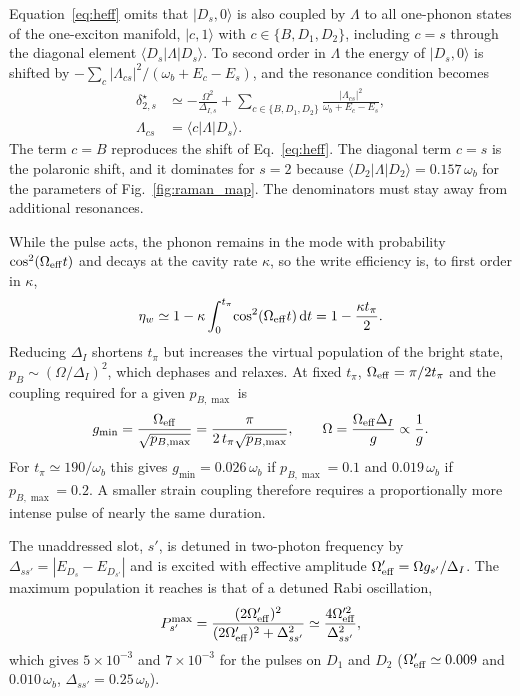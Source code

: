 \documentclass[aps,pra,preprint,groupedaddress,amsmath,amssymb,floatfix]{revtex4-2}
\newcommand{\ket}[1]{\lvert #1\rangle}
\newcommand{\bra}[1]{\langle #1\rvert}
\newcommand{\wb}{\omega_b}
\begin{document}
Equation~\eqref{eq:heff} omits that $\ket{D_s,0}$ is also coupled by $\Lambda$ to all one-phonon states of the one-exciton manifold, $\ket{c,1}$ with $c\in\{B,D_1,D_2\}$, including $c=s$ through the diagonal element $\bra{D_s}\Lambda\ket{D_s}$. To second order in $\Lambda$ the energy of $\ket{D_s,0}$ is shifted by $-\sum_c|\Lambda_{cs}|^2/(\wb+E_c-E_s)$, and the resonance condition becomes
\begin{align}
\delta_{2,s}^{\star}&\simeq-\frac{\Omega^2}{\Delta_{I,s}}+\sum_{c\in\{B,D_1,D_2\}}\frac{|\Lambda_{cs}|^2}{\wb+E_c-E_s},\nonumber\\
\Lambda_{cs}&=\bra c\Lambda\ket{D_s}.\label{eq:stark}
\end{align}
The term $c=B$ reproduces the shift of Eq.~\eqref{eq:heff}. The diagonal term $c=s$ is the polaronic shift, and it dominates for $s=2$ because $\bra{D_2}\Lambda\ket{D_2}=0.157\,\wb$ for the parameters of Fig.~\ref{fig:raman_map}. The denominators must stay away from additional resonances.

While the pulse acts, the phonon remains in the mode with probability $\cos^2(\Omega_{\rm eff}t)$ and decays at the cavity rate $\kappa$, so the write efficiency is, to first order in $\kappa$,
\begin{equation}
\eta_w\simeq1-\kappa\int_0^{t_\pi}\!\cos^2(\Omega_{\rm eff}t)\,\mathrm dt=1-\frac{\kappa t_\pi}{2}.\label{eq:etaw}
\end{equation}
Reducing $\Delta_I$ shortens $t_\pi$ but increases the virtual population of the bright state, $p_B\sim(\Omega/\Delta_I)^2$, which dephases and relaxes. At fixed $t_\pi$, $\Omega_{\rm eff}=\pi/2t_\pi$ and the coupling required for a given $p_{B,\max}$ is
\begin{equation}
g_{\min}=\frac{\Omega_{\rm eff}}{\sqrt{p_{B,\max}}}=\frac{\pi}{2\,t_\pi\sqrt{p_{B,\max}}},\qquad \Omega=\frac{\Omega_{\rm eff}\Delta_I}{g}\propto\frac1g.\label{eq:gmin}
\end{equation}
For $t_\pi\simeq190/\wb$ this gives $g_{\min}=0.026\,\wb$ if $p_{B,\max}=0.1$ and $0.019\,\wb$ if $p_{B,\max}=0.2$. A smaller strain coupling therefore requires a proportionally more intense pulse of nearly the same duration.

The unaddressed slot, $s'$, is detuned in two-photon frequency by $\Delta_{ss'}=|E_{D_s}-E_{D_{s'}}|$ and is excited with effective amplitude $\Omega_{\rm eff}'=\Omega g_{s'}/\Delta_I$. The maximum population it reaches is that of a detuned Rabi oscillation,
\begin{equation}
P_{s'}^{\max}=\frac{(2\Omega_{\rm eff}')^2}{(2\Omega_{\rm eff}')^2+\Delta_{ss'}^2}\simeq\frac{4\Omega_{\rm eff}'^2}{\Delta_{ss'}^2},\label{eq:leak}
\end{equation}
which gives $5\times10^{-3}$ and $7\times10^{-3}$ for the pulses on $D_1$ and $D_2$ ($\Omega_{\rm eff}'\simeq0.009$ and $0.010\,\wb$, $\Delta_{ss'}=0.25\,\wb$).
\end{document}
